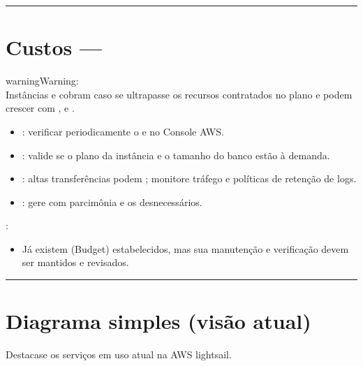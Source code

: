 \documentclass[letterpaper,10pt,brazil]{sphinxmanual}
\begin{document}
\bigskip\hrule\bigskip



\section{Custos — }
\label{\detokenize{sistemas/aws:custos-atencao}}
\begin{sphinxadmonition}{warning}{Warning:}
\sphinxAtStartPar
{}\\
Instâncias  e  cobram  caso se ultrapasse os recursos contratados no plano e podem crescer com ,  e .
\begin{itemize}
\item {} 
\sphinxAtStartPar
{}: verificar periodicamente o  e  no Console AWS.

\item {} 
\sphinxAtStartPar
{}: valide se o plano da instância e o tamanho do banco estão  à demanda.

\item {} 
\sphinxAtStartPar
{}: altas transferências podem ; monitore tráfego e políticas de retenção de logs.

\item {} 
\sphinxAtStartPar
{}: gere com parcimônia e  os desnecessários.

\end{itemize}
\end{sphinxadmonition}

\sphinxAtStartPar
{}:
\begin{itemize}
\item {} 
\sphinxAtStartPar
Já existem  (Budget) estabelecidos, mas sua manutenção e verificação devem ser mantidos e revisados.

\end{itemize}


\bigskip\hrule\bigskip



\section{Diagrama simples (visão atual)}
\label{\detokenize{sistemas/aws:diagrama-simples-visao-atual}}
\sphinxAtStartPar
Destaca\sphinxhyphen{}se os serviços em uso atual na AWS lightsail.
\end{document}
